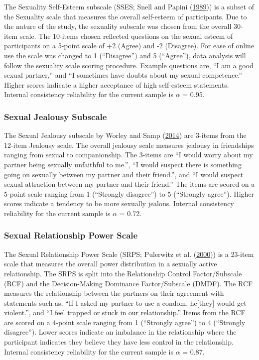 \documentclass[
  donotrepeattitle,doc, 12pt, a4paper,floatsintext]{apa7}
\begin{document}
The Sexuality Self-Esteem subscale (SSES; Snell and Papini (\protect\hyperlink{ref-snell1989}{1989})) is a subset of the Sexuality scale that measures the overall self-esteem of participants. Due to the nature of the study, the sexuality subscale was chosen from the overall 30-item scale. The 10-items chosen reflected questions on the sexual esteem of participants on a 5-point scale of +2 (Agree) and -2 (Disagree). For ease of online use the scale was changed to 1 (``Disagree'') and 5 (``Agree''), data analysis will follow the sexuality scale scoring procedure. Example questions are, ``I am a good sexual partner,'' and ``I sometimes have doubts about my sexual competence.'' Higher scores indicate a higher acceptance of high self-esteem statements. Internal consistency reliability for the current sample is \(\alpha\) = 0.95.

\hypertarget{sexual-jealousy-subscale-1}{%
\subsubsection{Sexual Jealousy Subscale}\label{sexual-jealousy-subscale-1}}

The Sexual Jealousy subscale by Worley and Samp (\protect\hyperlink{ref-worley2014}{2014}) are 3-items from the 12-item Jealousy scale. The overall jealousy scale measures jealousy in friendships ranging from sexual to companionship. The 3-items are ``I would worry about my partner being sexually unfaithful to me.'', ``I would suspect there is something going on sexually between my partner and their friend.'', and ``I would suspect sexual attraction between my partner and their friend.'' The items are scored on a 5-point scale ranging from 1 (``Strongly disagree'') to 5 (``Strongly agree''). Higher scores indicate a tendency to be more sexually jealous. Internal consistency reliability for the current sample is \(\alpha\) = 0.72.

\hypertarget{sexual-relationship-power-scale-1}{%
\subsubsection{Sexual Relationship Power Scale}\label{sexual-relationship-power-scale-1}}

The Sexual Relationship Power Scale (SRPS; Pulerwitz et al. (\protect\hyperlink{ref-pulerwitz2000}{2000})) is a 23-item scale that measures the overall power distribution in a sexually active relationship. The SRPS is split into the Relationship Control Factor/Subscale (RCF) and the Decision-Making Dominance Factor/Subscale (DMDF). The RCF measures the relationship between the partners on their agreement with statements such as, ``If I asked my partner to use a condom, he{[}they{]} would get violent.'', and ``I feel trapped or stuck in our relationship.'' Items from the RCF are scored on a 4-point scale ranging from 1 (``Strongly agree'') to 4 (``Strongly disagree''). Lower scores indicate an imbalance in the relationship where the participant indicates they believe they have less control in the relationship. Internal consistency reliability for the current sample is \(\alpha\) = 0.87.
\end{document}
